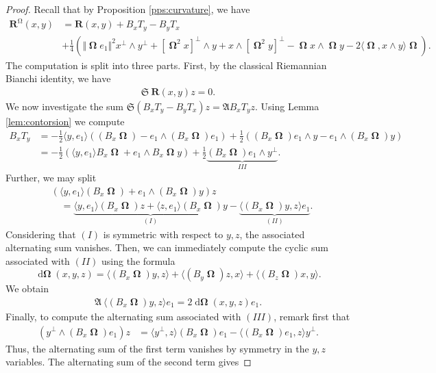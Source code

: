 \documentclass[12pt]{amsart}
\numberwithin{numbering}{section}
\theoremstyle{plain}
\theoremstyle{definition}
\theoremstyle{remark}
\numberwithin{equation}{section}
\DeclareMathOperator{\oo}{\mathbf{\Omega}}
\DeclareMathOperator{\doo}{d\mathbf{\Omega}}
\DeclareMathOperator{\mg}{\Omega}
\newcommand{\rfm}{\mathbf{R}}
\newcommand{\rsfm}{\mathbf{R}^{\mg}}
\newcommand{\con}[1]{T_{#1}}
\newcommand{\frk}[1]{\mathfrak{#1}}
\begin{document}
\begin{proof} Recall that by Proposition \ref{pps:curvature}, we have 
\begin{align*}
\rsfm(x, y) &= \rfm(x, y) + B_x \con{y} - B_y \con{x} \\ 
&+ \frac{1}{4} (\Vert \oo e_1 \Vert^2 x^\perp \wedge y^\perp + [\oo^2 x]^\perp \wedge y + x \wedge [\oo^2 y]^\perp - \oo x \wedge \oo y - 2 \langle \oo, x \wedge y \rangle \oo). 
\end{align*}
The computation is split into three parts. First, by the classical Riemannian Bianchi identity, we have 
\begin{align}
\frk{S} \ \rfm(x, y) z = 0.
\end{align}
\bigskip 
We now investigate the sum $\frk{S} (B_x T_y - B_y T_x)z = \frk{A} B_x T_y z$. Using Lemma \ref{lem:contorsion} we compute
\begin{align*}
B_x T_y &= - \frac{1}{2} \langle y, e_1 \rangle ((B_x \oo) - e_1 \wedge (B_x \oo) e_1) + \frac{1}{2} ((B_x \oo) e_1 \wedge y - e_1 \wedge (B_ x \oo) y) \\ 
&= -\frac{1}{2} (\langle y, e_1 \rangle B_x \oo + e_1 \wedge B_x \oo y) + \frac{1}{2} \underbrace{(B_x \oo) e_1 \wedge y^\perp}_{III}.
\end{align*}
Further, we may split 
\begin{align*}
&(\langle y, e_1 \rangle (B_x \oo) + e_1 \wedge (B_x \oo) y) z \\ 
&\quad = \underbrace{\langle y, e_1 \rangle (B_x \oo) z + \langle z, e_1 \rangle (B_x \oo) y}_{(I)} - \underbrace{\langle (B_x \oo) y, z \rangle e_1}_{(II)}.
\end{align*}
Considering that $(I)$ is symmetric with respect to $y, z$, the associated alternating sum vanishes. Then, we can immediately compute the cyclic sum associated with $(II)$ using the formula 
\[ \doo(x, y, z) = \langle (B_x \oo) y, z \rangle + \langle (B_y \oo) z, x \rangle + \langle (B_z \oo) x, y \rangle. \] 
We obtain 
\begin{align*}
\frk{A} \ \langle (B_x \oo) y, z \rangle e_1 = 2 \doo(x, y, z) e_1.
\end{align*}
Finally, to compute the alternating sum associated with $(III)$, remark first that 
\begin{align*}
(y^\perp \wedge (B_x \oo) e_1) z 
&= \langle y^\perp, z \rangle (B_x \oo) e_1 - \langle (B_x \oo) e_1, z \rangle y^\perp.
\end{align*}
Thus, the alternating sum of the first term vanishes by symmetry in the $y, z$ variables. The alternating sum of the second term gives 

\end{proof}
\end{document}
